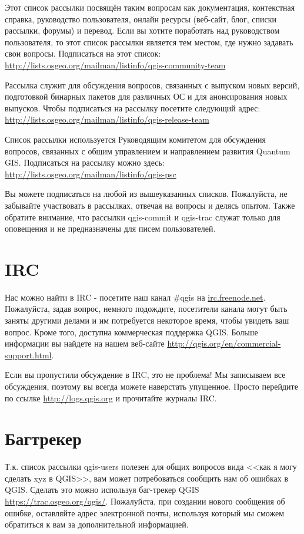 Этот список рассылки посвящён таким вопросам как документация,
контекстная справка, руководство пользователя, онлайн ресурсы (веб-сайт,
блог, списки рассылки, форумы) и перевод. Если вы хотите поработать над
руководством пользователя, то этот список рассылки является тем местом,
где нужно задавать свои вопросы. Подписаться на этот список: \\
\url{http://lists.osgeo.org/mailman/listinfo/qgis-community-team}

Рассылка служит для обсуждения вопросов, связанных с выпуском новых
версий, подготовкой бинарных пакетов для различных ОС и для
анонсирования новых выпусков. Чтобы подписаться на рассылку посетите
следующий адрес:\\
\url{http://lists.osgeo.org/mailman/listinfo/qgis-release-team}

Список рассылки используется Руководящим комитетом для обсуждения
вопросов, связанных с общим управлением и направлением развития Quantum
GIS. Подписаться на рассылку можно здесь:\\
\url{http://lists.osgeo.org/mailman/listinfo/qgis-psc}

Вы можете подписаться на любой из вышеуказанных списков. Пожалуйста, не
забывайте участвовать в рассылках, отвечая на вопросы и делясь опытом.
Также обратите внимание, что рассылки qgis-commit и qgis-trac служат
только для оповещения и не предназначены для писем пользователей.

\section{IRC}
Нас можно найти в IRC - посетите наш канал \#qgis на
\url{irc.freenode.net}. Пожалуйста, задав вопрос, немного подождите,
посетители канала могут быть заняты другими делами и им потребуется
некоторое время, чтобы увидеть ваш вопрос. Кроме того, доступна
коммерческая поддержка QGIS. Больше информации вы найдете на нашем
веб-сайте \url{http://qgis.org/en/commercial-support.html}.

Если вы пропустили обсуждение в IRC, это не проблема! Мы записываем все
обсуждения, поэтому вы всегда можете наверстать упущенное. Просто
перейдите по ссылке \url{http://logs.qgis.org} и прочитайте журналы IRC.

\section{Багтрекер}
Т.к. список рассылки qgis-users полезен для общих вопросов вида <<как я
могу сделать xyz в QGIS>>, вам может потребоваться сообщить нам об
ошибках в QGIS. Сделать это можно используя баг-трекер QGIS
\url{https://trac.osgeo.org/qgis/}. Пожалуйста, при создании нового
сообщения об ошибке, оставляйте адрес электронной почты, используя
который мы сможем обратиться к вам за дополнительной информацией.


